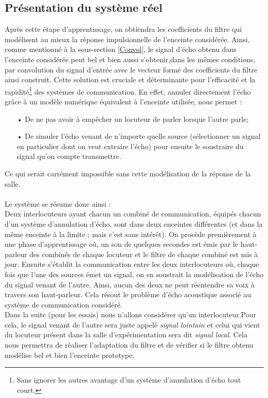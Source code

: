 \subsection{Présentation du système réel}
Après cette étape d'apprentissage, on obtiendra les coefficients du filtre qui modélisent au mieux la réponse impulsionnelle de l'enceinte considérée. Ainsi, comme mentionné à la sous-section \ref{Convol}, le signal d'écho obtenu dans l'enceinte considérée peut bel et bien aussi s'obtenir,dans les mêmes conditions, par convolution du signal d'entrée avec le vecteur formé des coefficients du filtre ainsi construit. Cette solution est cruciale et déterminante pour l'efficacité et la rapidité\footnote{Sans ignorer les autres avantage d'un système d'annulation d'écho tout court.} des systèmes de communication. En effet, annuler directement l'écho grâce à un modèle numérique équivalent à l'enceinte utilisée, nous permet :
\begin{itemize}
\item[•] De ne pas avoir à empêcher un locuteur de parler lorsque l'autre parle;
\item[•] De simuler l'écho venant de n'importe quelle source (sélectionner un signal en particulier dont on veut extraire l'écho) pour ensuite le soustraire du signal qu'on compte transmettre.
\end{itemize}
Ce qui serait carrément impossible sans cette modélisation de la réponse de la salle.
\paragraph{}
Le système se résume donc ainsi :\\
Deux interlocuteurs ayant chacun un combiné de communication, équipés chacun d'un système d'annulation d'écho, sont dans deux enceintes différentes (et dans la même enceinte à la limite ; mais c'est sans intérêt). On procède premièrement à une phase d'apprentissage où, un son de quelques secondes est émis par le haut-parleur des combinés de chaque locuteur et le filtre de chaque combiné est mis à jour. Ensuite s'établit la communication entre les deux interlocuteurs où, chaque fois que l'une des sources émet un signal, on en soustrait la modélisation de l'écho du signal venant de l'autre. Ainsi, aucun des deux ne peut réentendre sa voix à travers son haut-parleur. Cela résout le problème d'écho acoustique associé au système de communication considéré.\\ Dans la suite (pour les essais) nous n'allons considérer qu'un interlocuteur.Pour cela, le signal venant de l'autre sera juste appelé \emph{signal lointain} et celui qui vient du locuteur présent dans la salle d'expérimentation sera dit \emph{signal local}. Cela nous permettra de réaliser l'adaptation du filtre et de vérifier si le filtre obtenu modélise bel et bien l'enceinte prototype.
